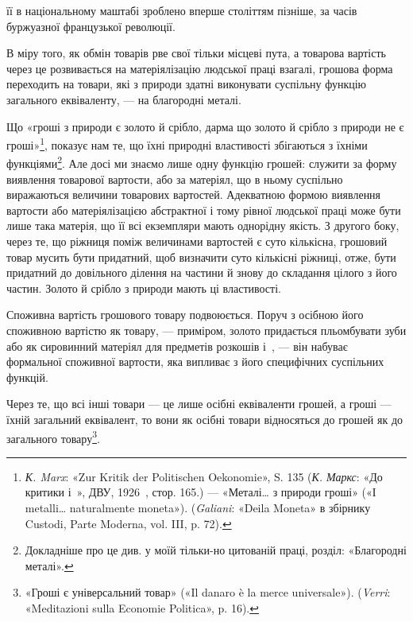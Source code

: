 \parcont{}  %
її в національному маштабі зроблено вперше століттям пізніше,
за часів буржуазної французької революції.

В міру того, як обмін товарів рве свої тільки місцеві пута,
а товарова вартість через це розвивається на матеріялізацію
людської праці взагалі, грошова форма переходить на товари,
які з природи здатні виконувати суспільну функцію загального
еквіваленту, — на благородні металі.

Що «гроші з природи є золото й срібло, дарма що золото й
срібло з природи не є гроші»\footnote{
\emph{К. Marx}: «Zur Kritik der Politischen Oekonomie», S. 135 (\emph{К. Маркс}:
«До критики і~», ДВУ, 1926~, стор. 165.) — «Металі\dots{} з природи
гроші» («І metalli\dots{} naturalmente moneta»). (\emph{Galiani}: «Deila Moneta»
в збірнику Custodi, Parte Moderna, vol. III, p. 72).
}, показує нам те, що їхні природні
властивості збігаються з їхніми функціями\footnote{
Докладніше про це див. у моїй тільки-но цитованій праці, розділ:
«Благородні металі».
}. Але досі
ми знаємо лише одну функцію грошей: служити за форму виявлення
товарової вартости, або за матеріял, що в ньому суспільно
виражаються величини товарових вартостей. Адекватною формою
виявлення вартости або матеріялізацією абстрактної і тому рівної
людської праці може бути лише така матерія, що її всі екземпляри
мають однорідну якість. З другого боку, через те, що ріжниця
поміж величинами вартостей є суто кількісна, грошовий товар
мусить бути придатний, щоб визначити суто кількісні ріжниці,
отже, бути придатний до довільного ділення на частини й знову
до складання цілого з його частин. Золото й срібло з природи
мають ці властивості.

Споживна вартість грошового товару подвоюється. Поруч з
осібною його споживною вартістю як товару, — приміром, золото
придається пльомбувати зуби або як сировинний матеріял
для предметів розкошів і~, — він набуває формальної споживної
вартости, яка випливає з його специфічних суспільних
функцій.

Через те, що всі інші товари — це лише осібні еквіваленти
грошей, а гроші — їхній загальний еквівалент, то вони як осібні
товари відносяться до грошей як до загального товару\footnote{
«Гроші є універсальний товар» («Il danaro è la merce universale»).
(\emph{Verri}: «Meditazioni sulla Economie Politica», p. 16).
}.

